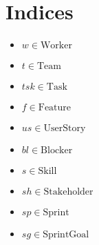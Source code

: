 \documentclass[11pt]{article}
\begin{document}
\section{Indices}
\begin{itemize}
    \item $w \in \text{Worker}$
    \item $t \in \text{Team}$
    \item $tsk \in \text{Task}$
    \item $f \in \text{Feature}$
    \item $us \in \text{UserStory}$
    \item $bl \in \text{Blocker}$
    \item $s \in \text{Skill}$
    \item $sh \in \text{Stakeholder}$
    \item $sp \in \text{Sprint}$
    \item $sg \in \text{SprintGoal}$
\end{itemize}
\end{document}

